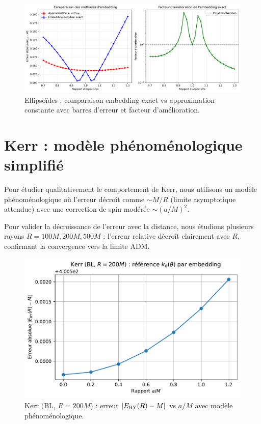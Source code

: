 \documentclass[11pt]{article}
\begin{document}
\begin{figure}[!htb]
\centering
\includegraphics[width=.75\linewidth]{fig_ellipsoids_embedding_comparison.pdf}
\caption{Ellipso\"ides : comparaison embedding exact vs approximation constante avec barres d'erreur et facteur d'am\'elioration.}
\end{figure}
\clearpage

\section{Kerr : mod\`ele ph\'enom\'enologique simplifi\'e}
Pour \'etudier qualitativement le comportement de Kerr, nous utilisons un mod\`ele ph\'enom\'enologique o\`u l'erreur d\'ecro\^it comme $\sim M/R$ (limite asymptotique attendue) avec une correction de spin mod\'er\'ee $\sim (a/M)^2$.

Pour valider la d\'ecroissance de l'erreur avec la distance, nous \'etudions plusieurs rayons $R = 100M, 200M, 500M$ : l'erreur relative d\'ecro\^it clairement avec $R$, confirmant la convergence vers la limite ADM.

\begin{figure}[!htb]
\centering
\includegraphics[width=.75\linewidth]{fig_kerr_embedding_refined.pdf}
\caption{Kerr (BL, $R=200M$) : erreur $|E_{\rm BY}(R)-M|$ vs $a/M$ avec mod\`ele ph\'enom\'enologique.}
\end{figure}
\end{document}

